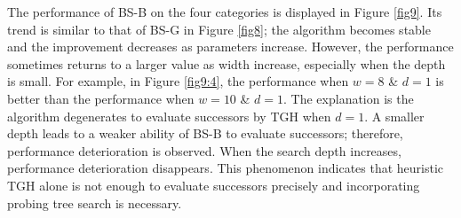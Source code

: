 \documentclass[review,3p,times,authoryear,12pt]{elsarticle}
\begin{document}
The performance of BS-B on the four categories is displayed in Figure \ref{fig9}. Its trend is similar to that of BS-G in Figure \ref{fig8}; the algorithm becomes stable and the improvement decreases as parameters increase. However, the performance sometimes returns to a larger value as width increase, especially when the depth is small. For example, in Figure \ref{fig9:4}, the performance when $w=8$ \& $d=1$ is better than the performance when $w=10$ \& $d=1$. The explanation is the algorithm degenerates to evaluate successors by TGH when $d=1$. A smaller depth leads to a weaker ability of BS-B to evaluate successors; therefore, performance deterioration is observed. When the search depth increases, performance deterioration disappears. This phenomenon indicates that heuristic TGH alone is not enough to evaluate successors precisely and incorporating probing tree search is necessary.
\end{document}
